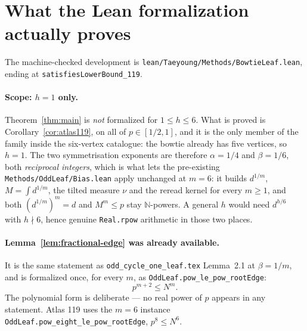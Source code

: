 \documentclass[11pt]{article}
\begin{document}
\section{What the Lean formalization actually proves}

The machine-checked development is \texttt{lean/Taeyoung/Methods/BowtieLeaf.lean},
ending at \texttt{satisfiesLowerBound\_119}.

\paragraph{Scope: $h=1$ only.}
Theorem~\ref{thm:main} is \emph{not} formalized for $1\leq h\leq6$.  What is
proved is Corollary~\ref{cor:atlas119}, on all of $p\in[1/2,1]$, and it is the
only member of the family inside the six-vertex catalogue: the bowtie already
has five vertices, so $h=1$.  The two symmetrisation exponents are therefore
$\alpha=1/4$ and $\beta=1/6$, both \emph{reciprocal integers}, which is what
lets the pre-existing \texttt{Methods/OddLeaf/Bias.lean} apply unchanged at
$m=6$: it builds $d^{1/m}$, $M=\int d^{1/m}$, the tilted measure $\nu$ and the
reread kernel for every $m\geq1$, and both $(d^{1/m})^m=d$ and $M^m\leq p$ stay
$\mathbb{N}$-powers.  A general $h$ would need $d^{h/6}$ with $h\nmid6$, hence
genuine \texttt{Real.rpow} arithmetic in those two places.

\paragraph{Lemma~\ref{lem:fractional-edge} was already available.}
It is the same statement as \texttt{odd\_cycle\_one\_leaf.tex} Lemma~2.1 at
$\beta=1/m$, and is formalized once, for every $m$, as
\texttt{OddLeaf.pow\_le\_pow\_rootEdge}:
\[
 p^{m+2}\leq N^m .
\]
The polynomial form is deliberate --- no real power of $p$ appears in any
statement.  Atlas 119 uses the $m=6$ instance
\texttt{OddLeaf.pow\_eight\_le\_pow\_rootEdge}, $p^8\leq N^6$.
\end{document}
